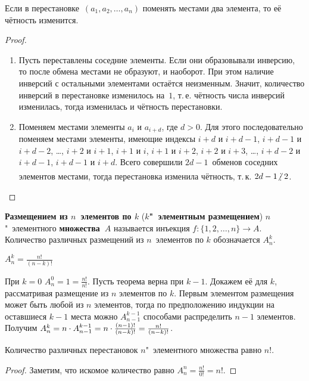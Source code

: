 \begin{statement}
\label{st:parity_of_permutation}
Если в перестановке~$(a_1, a_2, \ldots, a_n)$ поменять местами два элемента, то её чётность изменится.
\end{statement}
\begin{proof}
\begin{enumerate}
	\item Пусть переставлены соседние элементы.
	Если они образовывали инверсию, то после обмена местами не образуют, и наоборот.
	При этом наличие инверсий с остальными элементами остаётся неизменным.
	Значит, количество инверсий в перестановке изменилось на~$1$, т.\,е. чётность числа инверсий изменилась, тогда изменилась и чётность перестановки.
	
	\item Поменяем местами элементы $a_i$ и $a_{i+d}$, где $d > 0$.
	Для этого последовательно поменяем местами элементы, имеющие индексы $i+d$ и $i+d-1$, $i+d-1$ и $i+d-2$, \ldots, $i+2$ и $i+1$, $i+1$ и $i$, $i+1$ и $i+2$, $i+2$ и $i+3$, \ldots, $i+d-2$ и $i+d-1$, $i+d-1$ и $i+d$.
	Всего совершили $2d - 1$~обменов соседних элементов местами, тогда перестановка изменила чётность, т.\,к. $2d - 1 \notmult 2$.
\end{enumerate}
\end{proof}

 \textbf{Размещением из $n$~элементов по $k$} (\textbf{$k$"~элементным размещением}) $n$"~элементного \textbf{множества~$A$} называется инъекция $f \colon \{ 1, 2, \ldots, n \} \to A$.
Количество различных размещений из $n$~элементов по $k$ обозначается $A_n^k$.

\begin{statement}
$A_n^k = \frac{n!}{(n - k)!}$
\end{statement}
\begin{proofmathind}
	\indbase При $k = 0$ $A_n^0 = 1 = \frac{n!}{n!}$.
	\indstep Пусть теорема верна при $k - 1$.
	Докажем её для $k$, рассматривая размещение из $n$ элементов по $k$.
	Первым элементом размещения может быть любой из $n$ элементов, тогда по предположению индукции на оставшиеся $k - 1$ места можно $A_{n-1}^{k-1}$ способами распределить $n - 1$ элементов.
	Получим $A_n^k \opbr= n \cdot A_{n-1}^{k-1} \opbr= n \cdot \frac{(n - 1)!}{(n - k)!} \opbr= \frac{n!}{(n - k)!}$. \indend
\end{proofmathind}

\begin{consequent}
Количество различных перестановок $n$"~элементного множества равно $n!$.
\end{consequent}
\begin{proof}
Заметим, что искомое количество равно $A_n^n = \frac{n!}{0!} = n!$.
\end{proof}

